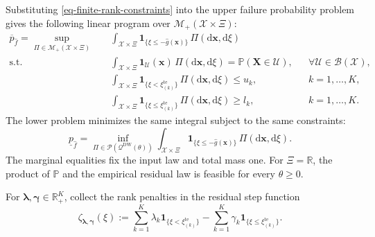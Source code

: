 \documentclass[review,11pt,3p,authoryear,nopreprintline]{elsarticle}
\begin{document}
Substituting \eqref{eq-finite-rank-constraints} into the upper failure probability problem gives the following linear program over $\mathcal M_+(\mathcal X\times\Xi)$:
\begin{equation}
  \begin{aligned}
    \overline p_{\hat f}
    =\sup_{\Pi\in\mathcal M_+(\mathcal X\times\Xi)}\quad&
      \int_{\mathcal X\times\Xi}
      \mathbf1_{\{\xi\le -\hat g(\bm x)\}}\,\Pi(\mathrm d\bm x,\mathrm d\xi)\\
    \text{s.t.}\quad&
      \int_{\mathcal X\times\Xi}
      \mathbf1_{\mathcal U}(\bm x)\,\Pi(\mathrm d\bm x,\mathrm d\xi)
      =\mathbb P(\bm X\in\mathcal U),
      &&\forall \mathcal U\in\mathcal B(\mathcal X),\\
    &\int_{\mathcal X\times\Xi}
      \mathbf1_{\{\xi<\xi_{(k)}^{\mathrm{te}}\}}\,\Pi(\mathrm d\bm x,\mathrm d\xi)\le u_k,
      &&k=1,\ldots,K,\\
    &\int_{\mathcal X\times\Xi}
      \mathbf1_{\{\xi\le \xi_{(k)}^{\mathrm{te}}\}}\,\Pi(\mathrm d\bm x,\mathrm d\xi)\ge l_k,
      &&k=1,\ldots,K.
  \end{aligned}
  \label{eq-measure-upper}
\end{equation}
The lower problem minimizes the same integral subject to the same constraints:
\begin{equation*}
  \underline p_{\hat f}
  =\inf_{\Pi\in\mathcal P(\mathcal Q^{\mathrm{DW}}(\theta))}
    \int_{\mathcal X\times\Xi}
    \mathbf1_{\{\xi\le -\hat g(\bm x)\}}\,\Pi(\mathrm d\bm x,\mathrm d\xi).
\end{equation*}
The marginal equalities fix the input law and total mass one. For $\Xi=\mathbb R$, the product of $\mathbb P$ and the empirical residual law is feasible for every $\theta\ge0$.

For $\bm\lambda,\bm\gamma\in\mathbb R_+^K$, collect the rank penalties in the residual step function
\begin{equation}
  \zeta_{\bm\lambda,\bm\gamma}(\xi)
  :=\sum_{k=1}^K\lambda_k\mathbf1_{\{\xi<\xi_{(k)}^{\mathrm{te}}\}}
    -\sum_{k=1}^K\gamma_k\mathbf1_{\{\xi\le\xi_{(k)}^{\mathrm{te}}\}}.
  \label{eq-dual-step-function}
\end{equation}
\end{document}
